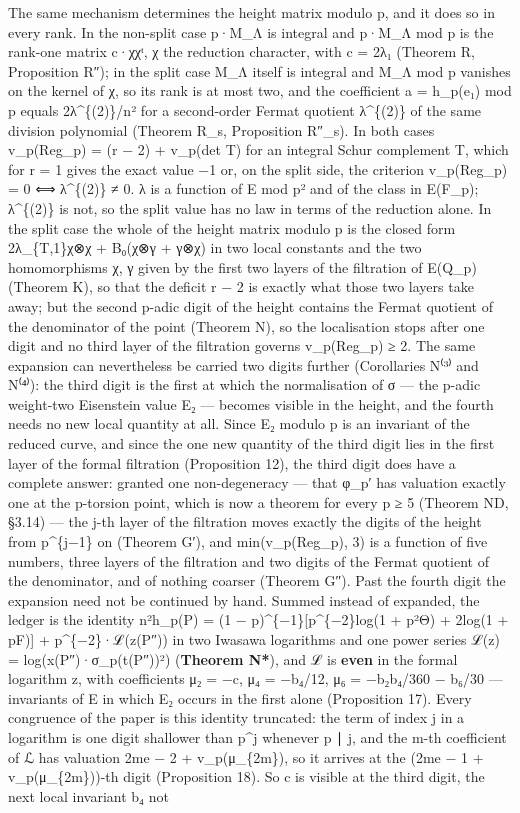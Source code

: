 \documentclass[11pt,a4paper]{article}
\theoremstyle{named}
\begin{document}
The same mechanism determines the height matrix modulo p, and it does so in every rank. In the non-split case p·M\_Λ is integral and p·M\_Λ mod p is the rank-one matrix c·χχᵗ, χ the reduction character, with c = 2λ₁ (Theorem R, Proposition R″); in the split case M\_Λ itself is integral and M\_Λ mod p vanishes on the kernel of χ, so its rank is at most two, and the coefficient a = h\_p(e₁) mod p equals 2λ\textasciicircum{}\{(2)\}/n² for a second-order Fermat quotient λ\textasciicircum{}\{(2)\} of the same division polynomial (Theorem R\_s, Proposition R″\_s). In both cases v\_p(Reg\_p) = (r − 2) + v\_p(det T) for an integral Schur complement T, which for r = 1 gives the exact value −1 or, on the split side, the criterion v\_p(Reg\_p) = 0 ⟺ λ\textasciicircum{}\{(2)\} ≠ 0. λ is a function of E mod p² and of the class in E(F\_p); λ\textasciicircum{}\{(2)\} is not, so the split value has no law in terms of the reduction alone. In the split case the whole of the height matrix modulo p is the closed form 2λ\_\{T,1\}χ⊗χ + B₀(χ⊗γ + γ⊗χ) in two local constants and the two homomorphisms χ, γ given by the first two layers of the filtration of E(Q\_p) (Theorem K), so that the deficit r − 2 is exactly what those two layers take away; but the second p-adic digit of the height contains the Fermat quotient of the denominator of the point (Theorem N), so the localisation stops after one digit and no third layer of the filtration governs v\_p(Reg\_p) ≥ 2. The same expansion can nevertheless be carried two digits further (Corollaries N⁽³⁾ and N⁽⁴⁾): the third digit is the first at which the normalisation of σ — the p-adic weight-two Eisenstein value E₂ — becomes visible in the height, and the fourth needs no new local quantity at all. Since E₂ modulo p is an invariant of the reduced curve, and since the one new quantity of the third digit lies in the first layer of the formal filtration (Proposition 12), the third digit does have a complete answer: granted one non-degeneracy — that φ\_p′ has valuation exactly one at the p-torsion point, which is now a theorem for every p ≥ 5 (Theorem ND, §3.14) — the j-th layer of the filtration moves exactly the digits of the height from p\textasciicircum{}\{j−1\} on (Theorem G′), and min(v\_p(Reg\_p), 3) is a function of five numbers, three layers of the filtration and two digits of the Fermat quotient of the denominator, and of nothing coarser (Theorem G″). Past the fourth digit the expansion need not be continued by hand. Summed instead of expanded, the ledger is the identity n²h\_p(P) = (1 − p)\textasciicircum{}\{−1\}[p\textasciicircum{}\{−2\}log(1 + p²Θ) + 2log(1 + pF)] + p\textasciicircum{}\{−2\}·ℒ(z(P″)) in two Iwasawa logarithms and one power series ℒ(z) = log(x(P″)·σ\_p(t(P″))²) (\textbf{Theorem N*}), and ℒ is \textbf{even} in the formal logarithm z, with coefficients μ₂ = −c, μ₄ = −b₄/12, μ₆ = −b₂b₄/360 − b₆/30 — invariants of E in which E₂ occurs in the first alone (Proposition 17). Every congruence of the paper is this identity truncated: the term of index j in a logarithm is one digit shallower than p\textasciicircum{}j whenever p ∣ j, and the m-th coefficient of ℒ has valuation 2me − 2 + v\_p(μ\_\{2m\}), so it arrives at the (2me − 1 + v\_p(μ\_\{2m\}))-th digit (Proposition 18). So c is visible at the third digit, the next local invariant b₄ not 
\end{document}

